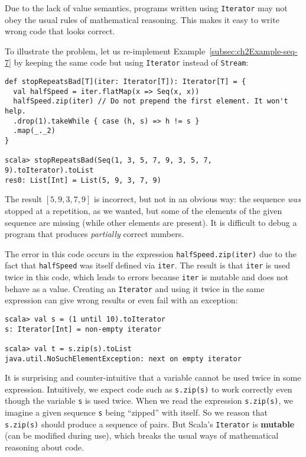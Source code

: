 Due to the lack of value semantics, programs written using \lstinline!Iterator!
may not obey the usual rules of mathematical reasoning. This
makes it easy to write wrong code that looks correct.

To illustrate the problem, let us re-implement Example~\ref{subsec:ch2Example-seq-7}
by keeping the same code but using \lstinline!Iterator! instead of
\lstinline!Stream!:
\begin{lstlisting}
def stopRepeatsBad[T](iter: Iterator[T]): Iterator[T] = {
  val halfSpeed = iter.flatMap(x => Seq(x, x))
  halfSpeed.zip(iter) // Do not prepend the first element. It won't help.
  .drop(1).takeWhile { case (h, s) => h != s }
  .map(_._2)
}

scala> stopRepeatsBad(Seq(1, 3, 5, 7, 9, 3, 5, 7, 9).toIterator).toList
res0: List[Int] = List(5, 9, 3, 7, 9)
\end{lstlisting}
The result $\left[5,9,3,7,9\right]$ is incorrect, but not in an obvious
way: the sequence \emph{was} stopped at a repetition, as we wanted,
but some of the elements of the given sequence are missing (while
other elements are present). It is difficult to debug a program that
produces \emph{partially} correct numbers.

The error in this code occurs in the expression \lstinline!halfSpeed.zip(iter)!
due to the fact that \lstinline!halfSpeed! was itself defined via
\lstinline!iter!. The result is that \lstinline!iter! is used twice
in this code, which leads to errors because \lstinline!iter! is mutable
and does not behave as a value. Creating an \lstinline!Iterator!
and using it twice in the same expression can give wrong results or
even fail with an exception:
\begin{lstlisting}
scala> val s = (1 until 10).toIterator
s: Iterator[Int] = non-empty iterator

scala> val t = s.zip(s).toList
java.util.NoSuchElementException: next on empty iterator
\end{lstlisting}
It is surprising and counter-intuitive that a variable cannot be used
twice in some expression. Intuitively, we expect code such as \lstinline!s.zip(s)!
to work correctly even though the variable \lstinline!s! is used
twice. When we read the expression \lstinline!s.zip(s)!, we imagine
a given sequence \lstinline!s! being \textsf{``}zipped\textsf{''} with itself. So
we reason that \lstinline!s.zip(s)! should produce a sequence of
pairs. But Scala\textsf{'}s \lstinline!Iterator! is \textbf{mutable} (can
be modified during use), which breaks the usual ways of mathematical
reasoning about code.

